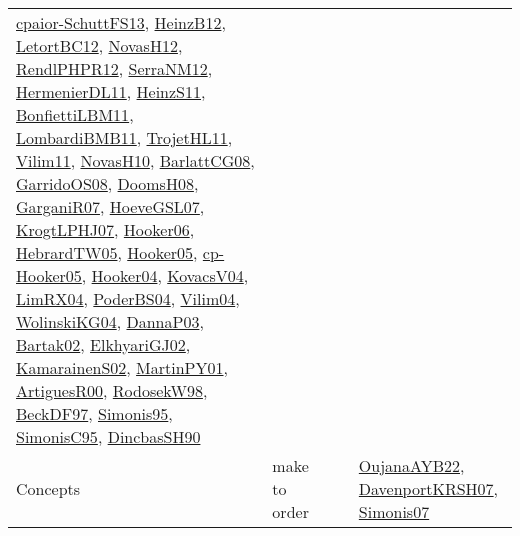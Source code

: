 {\begin{longtable}{lp{3cm}>{\raggedright}p{6cm}>{\raggedright}p{6cm}p{8cm}}
\href{papers/cpaior-SchuttFS13.pdf}{cpaior-SchuttFS13}\cite{cpaior-SchuttFS13}, \href{papers/HeinzB12.pdf}{HeinzB12}\cite{HeinzB12}, \href{papers/LetortBC12.pdf}{LetortBC12}\cite{LetortBC12}, \href{articles/NovasH12.pdf}{NovasH12}\cite{NovasH12}, \href{papers/RendlPHPR12.pdf}{RendlPHPR12}\cite{RendlPHPR12}, \href{papers/SerraNM12.pdf}{SerraNM12}\cite{SerraNM12}, \href{papers/HermenierDL11.pdf}{HermenierDL11}\cite{HermenierDL11}, \href{papers/HeinzS11.pdf}{HeinzS11}\cite{HeinzS11}, \href{papers/BonfiettiLBM11.pdf}{BonfiettiLBM11}\cite{BonfiettiLBM11}, \href{papers/LombardiBMB11.pdf}{LombardiBMB11}\cite{LombardiBMB11}, \href{articles/TrojetHL11.pdf}{TrojetHL11}\cite{TrojetHL11}, \href{papers/Vilim11.pdf}{Vilim11}\cite{Vilim11}, \href{articles/NovasH10.pdf}{NovasH10}\cite{NovasH10}, \href{papers/BarlattCG08.pdf}{BarlattCG08}\cite{BarlattCG08}, \href{articles/GarridoOS08.pdf}{GarridoOS08}\cite{GarridoOS08}, \href{papers/DoomsH08.pdf}{DoomsH08}\cite{DoomsH08}, \href{papers/GarganiR07.pdf}{GarganiR07}\cite{GarganiR07}, \href{papers/HoeveGSL07.pdf}{HoeveGSL07}\cite{HoeveGSL07}, \href{papers/KrogtLPHJ07.pdf}{KrogtLPHJ07}\cite{KrogtLPHJ07}, \href{articles/Hooker06.pdf}{Hooker06}\cite{Hooker06}, \href{papers/HebrardTW05.pdf}{HebrardTW05}\cite{HebrardTW05}, \href{articles/Hooker05.pdf}{Hooker05}\cite{Hooker05}, \href{papers/cp-Hooker05.pdf}{cp-Hooker05}\cite{cp-Hooker05}, \href{papers/Hooker04.pdf}{Hooker04}\cite{Hooker04}, \href{papers/KovacsV04.pdf}{KovacsV04}\cite{KovacsV04}, \href{papers/LimRX04.pdf}{LimRX04}\cite{LimRX04}, \href{articles/PoderBS04.pdf}{PoderBS04}\cite{PoderBS04}, \href{papers/Vilim04.pdf}{Vilim04}\cite{Vilim04}, \href{papers/WolinskiKG04.pdf}{WolinskiKG04}\cite{WolinskiKG04}, \href{papers/DannaP03.pdf}{DannaP03}\cite{DannaP03}, \href{papers/Bartak02.pdf}{Bartak02}\cite{Bartak02}, \href{papers/ElkhyariGJ02.pdf}{ElkhyariGJ02}\cite{ElkhyariGJ02}, \href{papers/KamarainenS02.pdf}{KamarainenS02}\cite{KamarainenS02}, \href{articles/MartinPY01.pdf}{MartinPY01}\cite{MartinPY01}, \href{articles/ArtiguesR00.pdf}{ArtiguesR00}\cite{ArtiguesR00}, \href{papers/RodosekW98.pdf}{RodosekW98}\cite{RodosekW98}, \href{papers/BeckDF97.pdf}{BeckDF97}\cite{BeckDF97}, \href{papers/Simonis95.pdf}{Simonis95}\cite{Simonis95}, \href{papers/SimonisC95.pdf}{SimonisC95}\cite{SimonisC95}, \href{articles/DincbasSH90.pdf}{DincbasSH90}\cite{DincbasSH90}\\
Concepts & make to order &  &  & \href{papers/OujanaAYB22.pdf}{OujanaAYB22}\cite{OujanaAYB22}, \href{papers/DavenportKRSH07.pdf}{DavenportKRSH07}\cite{DavenportKRSH07}, \href{articles/Simonis07.pdf}{Simonis07}\cite{Simonis07}\\

\end{longtable}}
